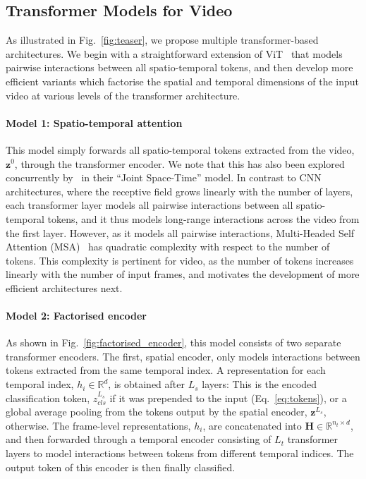 \subsection{Transformer Models for Video}
\label{sec:method_video_models}

As illustrated in Fig.~\ref{fig:teaser}, we propose multiple transformer-based architectures.
We begin with a straightforward extension of ViT~\cite{dosovitskiy_iclr_2021} that models pairwise interactions between all spatio-temporal tokens, and then develop more efficient variants which factorise the spatial and temporal dimensions of the input video at various levels of the transformer architecture.

\paragraph{Model 1: Spatio-temporal attention}
This model simply forwards all spatio-temporal tokens extracted from the video, $\mathbf{z}^{0}$, through the transformer encoder.
We note that this has also been explored concurrently by~\cite{bertasius_arxiv_2021} in their ``Joint Space-Time'' model.
In contrast to CNN architectures, where the receptive field grows linearly with the number of layers, each transformer layer models all pairwise interactions between all spatio-temporal tokens, and it thus models long-range interactions across the video from the first layer.
However, as it models all pairwise interactions, Multi-Headed Self Attention (MSA)~\cite{vaswani_neurips_2017} has quadratic complexity with respect to the number of tokens.
This complexity is pertinent for video, as the number of tokens increases linearly with the number of input frames, and motivates the development of more efficient architectures next.%

\paragraph{Model 2: Factorised encoder}


As shown in Fig.~\ref{fig:factorised_encoder}, this model consists of two separate transformer encoders.
The first, spatial encoder, only models interactions between tokens extracted from the same temporal index. %
A representation for each temporal index, $h_i \in \mathbb{R}^d$, is obtained after $L_s$ layers: This is the encoded classification token, $z_{cls}^{L_s}$ if it was prepended to the input (Eq.~\ref{eq:tokens}), or a global average pooling from the tokens output by the spatial encoder, $\mathbf{z}^{L_s}$, otherwise.
The frame-level representations, $h_i$, are concatenated into $\mathbf{H} \in \mathbb{R}^{n_t \times d}$, and then forwarded through a temporal encoder consisting of $L_t$ transformer layers to model interactions between tokens from different temporal indices.
The output token of this encoder is then finally classified.

